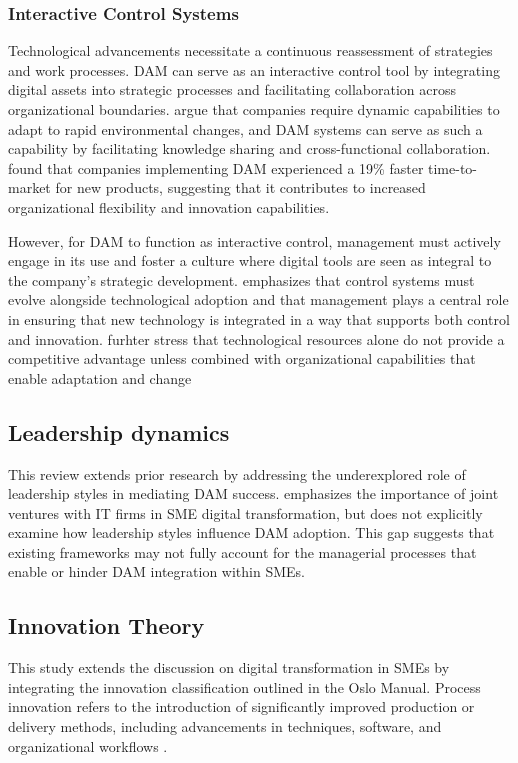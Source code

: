 \documentclass[a4paper,12pt,twocolumn]{article}
\begin{document}
\subsubsection{Interactive Control Systems}
Technological advancements necessitate a continuous reassessment of strategies and work processes. DAM can serve as an interactive control 
tool by integrating digital assets into strategic processes and facilitating collaboration across organizational boundaries.
\cite{teece1997} argue that companies require dynamic capabilities 
to adapt to rapid environmental changes, and DAM systems can serve as such a capability by facilitating knowledge sharing and cross-functional collaboration.
\cite{Mladenova2024} found that companies implementing DAM experienced a 19\% faster time-to-market for new products, 
suggesting that it contributes to increased organizational flexibility and innovation capabilities.

\vspace{0.3cm}
However, for DAM to function as interactive control, management must actively engage in its use and foster a culture where digital 
tools are seen as integral to the company’s strategic development. 
\cite{simons1995} emphasizes that control systems must evolve alongside technological adoption and that management plays a central 
role in ensuring that new technology is integrated in a way that supports both control and innovation. 
 \cite{eisenhardt2000} furhter stress that technological resources alone do not provide a competitive advantage
 unless combined with organizational capabilities that enable adaptation and change

\subsection{Leadership dynamics}
This review extends prior research by addressing the underexplored role of leadership styles in mediating DAM success. 
\cite{Civelek2023} emphasizes the importance of joint ventures with IT firms in SME digital transformation, but does not explicitly examine how leadership styles influence 
DAM adoption. This gap suggests that existing frameworks may not fully account for the managerial processes that enable or hinder DAM integration within SMEs.

\subsection{Innovation Theory}
This study extends the discussion on digital transformation in SMEs by integrating the innovation classification outlined in the Oslo Manual.
Process innovation refers to the introduction of significantly improved production or delivery methods, including advancements in techniques, software, and organizational workflows \cite{oecd2018oslo}. 
\end{document}
